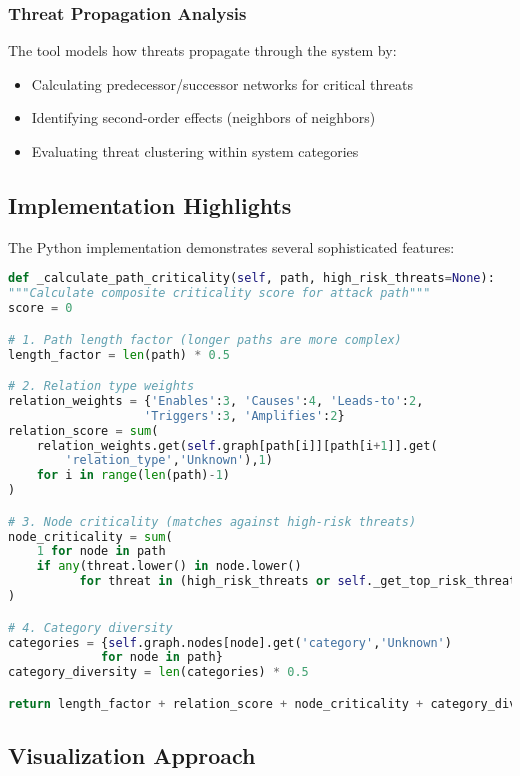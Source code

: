 \documentclass[binding=0.6cm]{sapthesis}
\begin{document}
\subsubsection{Threat Propagation Analysis}

The tool models how threats propagate through the system by:

\begin{itemize}
\item Calculating predecessor/successor networks for critical threats
\item Identifying second-order effects (neighbors of neighbors)
\item Evaluating threat clustering within system categories
\end{itemize}

\subsection{Implementation Highlights}

The Python implementation demonstrates several sophisticated features:

\begin{lstlisting}[language=Python, caption=Core Analysis Logic]
def _calculate_path_criticality(self, path, high_risk_threats=None):
"""Calculate composite criticality score for attack path"""
score = 0

# 1. Path length factor (longer paths are more complex)
length_factor = len(path) * 0.5

# 2. Relation type weights
relation_weights = {'Enables':3, 'Causes':4, 'Leads-to':2, 
                   'Triggers':3, 'Amplifies':2}
relation_score = sum(
    relation_weights.get(self.graph[path[i]][path[i+1]].get(
        'relation_type','Unknown'),1) 
    for i in range(len(path)-1)
)

# 3. Node criticality (matches against high-risk threats)
node_criticality = sum(
    1 for node in path 
    if any(threat.lower() in node.lower() 
          for threat in (high_risk_threats or self._get_top_risk_threats()))
)

# 4. Category diversity
categories = {self.graph.nodes[node].get('category','Unknown') 
             for node in path}
category_diversity = len(categories) * 0.5

return length_factor + relation_score + node_criticality + category_diversity
\end{lstlisting}

\subsection{Visualization Approach}
\end{document}
